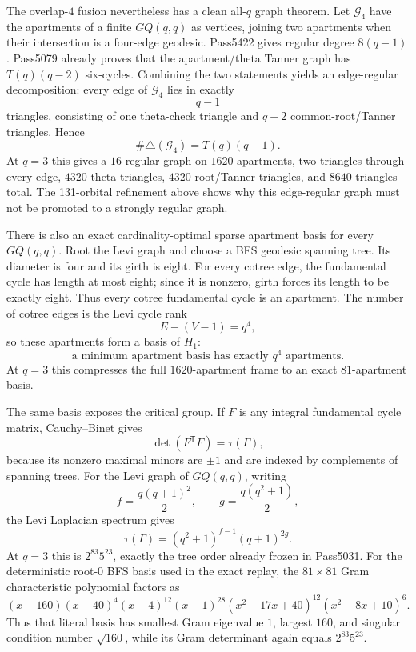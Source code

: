 The overlap-$4$ fusion nevertheless has a clean all-$q$ graph theorem.  Let
$\mathcal G_4$ have the apartments of a finite $GQ(q,q)$ as vertices, joining
two apartments when their intersection is a four-edge geodesic.  Pass5422 gives
regular degree $8(q-1)$.  Pass5079 already proves that the apartment/theta
Tanner graph has $T(q)(q-2)$ six-cycles.  Combining the two statements yields
an edge-regular decomposition: every edge of $\mathcal G_4$ lies in exactly
\[
 \boxed{q-1}
\]
triangles, consisting of one theta-check triangle and $q-2$ common-root/Tanner
triangles.  Hence
\[
 \#\triangle(\mathcal G_4)=T(q)(q-1).
\]
At $q=3$ this gives a $16$-regular graph on $1620$ apartments, two triangles
through every edge, $4320$ theta triangles, $4320$ root/Tanner triangles, and
$8640$ triangles total.  The 131-orbital refinement above shows why this
edge-regular graph must not be promoted to a strongly regular graph.

There is also an exact cardinality-optimal sparse apartment basis for every
$GQ(q,q)$.  Root the Levi graph and choose a BFS geodesic spanning tree.  Its
diameter is four and its girth is eight.  For every cotree edge, the fundamental
cycle has length at most eight; since it is nonzero, girth forces its length to
be exactly eight.  Thus every cotree fundamental cycle is an apartment.  The
number of cotree edges is the Levi cycle rank
\[
 E-(V-1)=q^4,
\]
so these apartments form a basis of $H_1$:
\[
 \boxed{\text{a minimum apartment basis has exactly }q^4\text{ apartments}.}
\]
At $q=3$ this compresses the full $1620$-apartment frame to an exact
$81$-apartment basis.

The same basis exposes the critical group.  If $F$ is any integral fundamental
cycle matrix, Cauchy--Binet gives
\[
 \det(F^{\mathsf T}F)=\tau(\Gamma),
\]
because its nonzero maximal minors are $\pm1$ and are indexed by complements of
spanning trees.  For the Levi graph of $GQ(q,q)$, writing
\[
 f=\frac{q(q+1)^2}{2},\qquad g=\frac{q(q^2+1)}2,
\]
the Levi Laplacian spectrum gives
\[
 \boxed{\tau(\Gamma)=(q^2+1)^{f-1}(q+1)^{2g}}.
\]
At $q=3$ this is $2^{83}5^{23}$, exactly the tree order already frozen in
Pass5031.  For the deterministic root-$0$ BFS basis used in the exact replay,
the $81\times81$ Gram characteristic polynomial factors as
\[
\boxed{
 (x-160)(x-40)^4(x-4)^{12}(x-1)^{28}
 (x^2-17x+40)^{12}(x^2-8x+10)^6 }.
\]
Thus that literal basis has smallest Gram eigenvalue $1$, largest $160$, and
singular condition number $\sqrt{160}$, while its Gram determinant again equals
$2^{83}5^{23}$.

